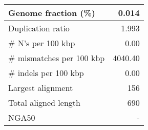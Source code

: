 \documentclass[12pt,a4paper]{article}
\begin{document}
\begin{table}[ht]
\begin{center}
\begin{tabular}{|l*{1}{|r}|}
Genome fraction (\%) & 0.014 \\ \hline
Duplication ratio & 1.993 \\ \hline
\# N's per 100 kbp & 0.00 \\ \hline
\# mismatches per 100 kbp & 4040.40 \\ \hline
\# indels per 100 kbp & 0.00 \\ \hline
Largest alignment & 156 \\ \hline
Total aligned length & 690 \\ \hline
NGA50 & - \\ \hline
\end{tabular}
\end{center}
\end{table}
\end{document}
